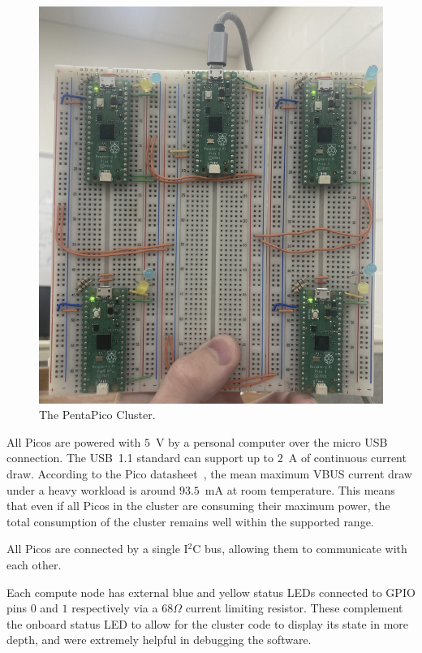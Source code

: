 \documentclass[conference]{IEEEtran}
\begin{document}
\begin{figure}[ht]
\includegraphics[width=\linewidth]{pico cluster.png}
\caption{The PentaPico Cluster.}
\label{pentapico_figure}
\end{figure}

All Picos are powered with $5$~V by a personal computer over the micro USB connection.
The USB~1.1 standard can support up to $2$~A of continuous current draw.
According to the Pico datasheet~\cite{picodocs:rpi}, the mean maximum VBUS current draw under a heavy workload is around $93.5$~mA at room temperature. 
This means that even if all Picos in the cluster are consuming their maximum power, the total consumption of the cluster remains well within the supported range.

All Picos are connected by a single I$^2$C bus, allowing them to communicate with each other. 

Each compute node has external blue and yellow status LEDs connected to GPIO pins $0$ and $1$ respectively via a $68\Omega$ current limiting resistor.
These complement the onboard status LED to allow for the cluster code to display its state in more depth, and were extremely helpful in debugging the software.
\end{document}
